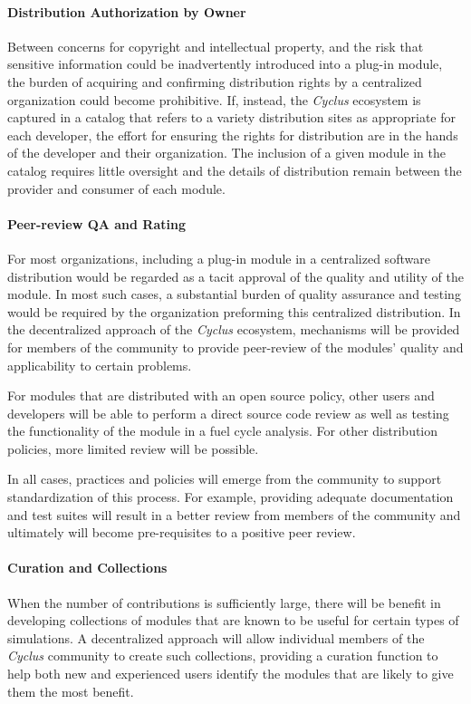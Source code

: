 \documentclass[letterpaper,10pt,english]{sphinxmanual}
\begin{document}
\paragraph{Distribution Authorization by Owner}
\label{basics/ecosystem:distribution-authorization-by-owner}
Between concerns for copyright and intellectual property, and the risk
that sensitive information could be inadvertently introduced into a
plug-in module, the burden of acquiring and confirming distribution
rights by a centralized organization could become prohibitive.  If,
instead, the \emph{Cyclus} ecosystem is captured in a catalog that refers
to a variety distribution sites as appropriate for each developer, the
effort for ensuring the rights for distribution are in the hands of
the developer and their organization.  The inclusion of a given module
in the catalog requires little oversight and the details of
distribution remain between the provider and consumer of each module.


\paragraph{Peer-review QA and Rating}
\label{basics/ecosystem:peer-review-qa-and-rating}
For most organizations, including a plug-in module in a centralized
software distribution would be regarded as a tacit approval of the
quality and utility of the module.  In most such cases, a substantial
burden of quality assurance and testing would be required by the
organization preforming this centralized distribution.  In the
decentralized approach of the \emph{Cyclus} ecosystem, mechanisms will be
provided for members of the community to provide peer-review of the
modules' quality and applicability to certain problems.

For modules that are distributed with an open source policy, other
users and developers will be able to perform a direct source code
review as well as testing the functionality of the module in a fuel
cycle analysis.  For other distribution policies, more limited review
will be possible.

In all cases, practices and policies will emerge from the community to
support standardization of this process.  For example, providing
adequate documentation and test suites will result in a better review
from members of the community and ultimately will become
pre-requisites to a positive peer review.


\paragraph{Curation and Collections}
\label{basics/ecosystem:curation-and-collections}
When the number of contributions is sufficiently large, there will be
benefit in developing collections of modules that are known to be
useful for certain types of simulations.  A decentralized approach
will allow individual members of the \emph{Cyclus} community to create such
collections, providing a curation function to help both new and
experienced users identify the modules that are likely to give them
the most benefit.
\end{document}
